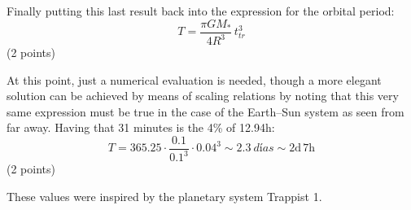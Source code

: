 \begin{description}
Finally putting this last result back into the expression for the orbital
period:
\[ T = \frac{\pi G M_*}{4R^3}\,t_{tr}^3 \]
\hfill(2 points)

At this point, just a numerical evaluation is needed, though a more elegant
solution can be achieved by means of scaling relations by noting that this
very same expression must be true in the case of the Earth--Sun system as seen
from far away. Having that 31 minutes is the 4\% of 12.94h:
\[ T = 365.25\cdot\frac{0.1}{0.1^3}\cdot 0.04^3
     \sim 2.3\ \textit{d\'ias} %
     \sim 2\mathrm{d}\,7\mathrm{h} \]
\hfill(2 points)

These values were inspired by the planetary system Trappist 1.
\end{description}


